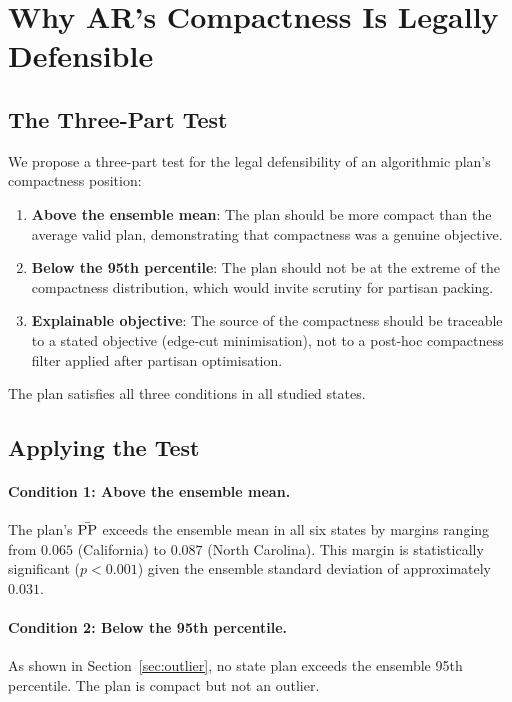 \section{Why AR's Compactness Is Legally Defensible}
\label{sec:legal}

\subsection{The Three-Part Test}

We propose a three-part test for the legal defensibility of an algorithmic
plan's compactness position:

\begin{enumerate}
  \item \textbf{Above the ensemble mean}: The plan should be more compact
    than the average valid plan, demonstrating that compactness was a genuine
    objective.
  \item \textbf{Below the 95th percentile}: The plan should not be at the
    extreme of the compactness distribution, which would invite scrutiny
    for partisan packing.
  \item \textbf{Explainable objective}: The source of the compactness should
    be traceable to a stated objective (edge-cut minimisation), not to a
    post-hoc compactness filter applied after partisan optimisation.
\end{enumerate}

The \ar{} plan satisfies all three conditions in all studied states.

\subsection{Applying the Test}

\paragraph{Condition 1: Above the ensemble mean.}
The \ar{} plan's $\bar{\mathrm{PP}}$ exceeds the ensemble mean in all six states
by margins ranging from $0.065$ (California) to $0.087$ (North Carolina).
This margin is statistically significant ($p < 0.001$) given the ensemble
standard deviation of approximately $0.031$.

\paragraph{Condition 2: Below the 95th percentile.}
As shown in Section~\ref{sec:outlier}, no \ar{} state plan exceeds the
ensemble 95th percentile.  The plan is compact but not an outlier.

